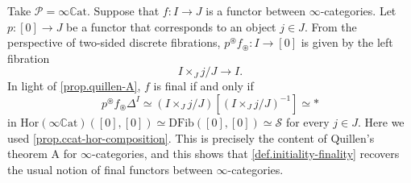 \documentclass[a4paper, 11pt]{amsart}
\numberwithin{theorem}{section}
\theoremstyle{definition}
\renewcommand{\S}{\mathscr{S}}
\renewcommand{\P}{\mathscr{P}}
\newcommand{\Hor}{\mathrm{Hor}}
\newcommand{\DFib}{\mathrm{DFib}}
\newcommand{\CCAT}{\mathbb{C}\mathrm{at}}
\begin{document}
\begin{example}
	Take $\P = \infty\CCAT$.
	Suppose that $f : I \rightarrow J$ is a functor between $\infty$-categories.
	Let $p : [0] \rightarrow J$ be a functor that corresponds to an object $j \in J$. From the perspective of two-sided discrete fibrations, 
	$p^\circledast f_\circledast : I \rightarrow [0]$ is given by the left fibration
	$$
	I \times_J j/J \rightarrow I.
	$$
	In light of \cref{prop.quillen-A}, $f$ is final if and only if 
	$$
	p^\circledast f_\circledast \Delta^I \simeq (I \times_J j/J)[(I \times_J j/J)^{-1}] \simeq \ast
	$$
	in $\Hor(\infty\CCAT)([0], [0]) \simeq \DFib([0],[0]) \simeq \S$ for every $j \in J$. Here 
	we used \cref{prop.ccat-hor-composition}. This is precisely the content of Quillen's theorem A for $\infty$-categories, and this 
	shows that \cref{def.initiality-finality} recovers the usual notion of final functors between $\infty$-categories.
\end{example}


\nocite{*}


\end{document}
